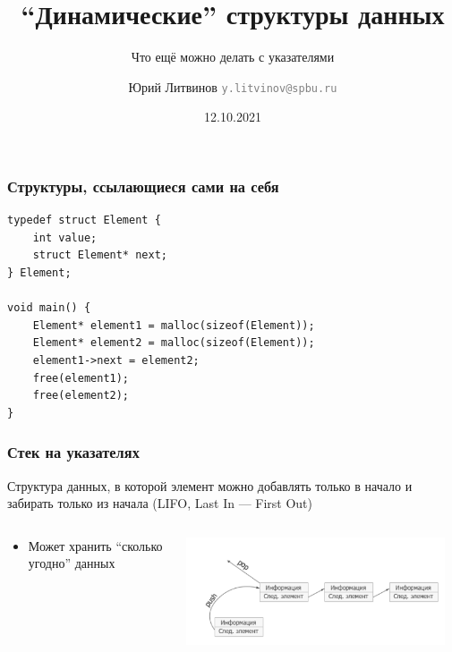 \documentclass[xetex,mathserif,serif]{beamer}
\title{``Динамические'' структуры данных}
\subtitle{Что ещё можно делать с указателями}
\author[Юрий Литвинов]{Юрий Литвинов \newline \textcolor{gray}{\small\texttt{y.litvinov@spbu.ru}}}
\date{12.10.2021}
\begin{document}
	
	\frame{\titlepage}
	
	\begin{frame}[fragile]
		\frametitle{Структуры, ссылающиеся сами на себя}
		\begin{footnotesize}
			\begin{verbatim}
typedef struct Element {
    int value;
    struct Element* next;
} Element;

void main() {
    Element* element1 = malloc(sizeof(Element));
    Element* element2 = malloc(sizeof(Element));
    element1->next = element2;
    free(element1);
    free(element2);
}
			\end{verbatim}
		\end{footnotesize}
	\end{frame}

	\begin{frame}
		\frametitle{Стек на указателях}
		Структура данных, в которой элемент можно добавлять только в начало и забирать только из начала (LIFO, Last In --- First Out)
		\begin{columns}
			\begin{small}
				\begin{column}{0.55\textwidth}
					\begin{itemize}
						\item Может хранить ``сколько угодно'' данных
						\begin{itemize}
						\end{itemize}
					\end{itemize}
				\end{column}
			\end{small}
				\begin{column}{0.45\textwidth}
					\begin{center}
						\includegraphics[width=0.95\textwidth]{stack.png}

\end{center}
\end{column}
\end{columns}
\end{frame}
\end{document}
